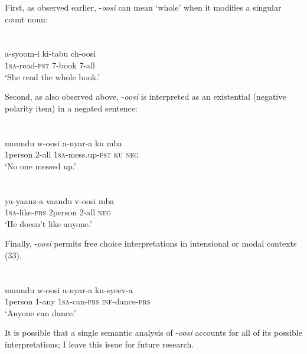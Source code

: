 \documentclass[output=paper]{langsci/langscibook}
\begin{document}
  First, as observed earlier, -\textit{oosi} can mean ‘whole’ when it modifies a singular count noun:

\chapter[  ]{  }
\gll a-syoom-i  ki-tabu  ch-oosi\\
     1\textsc{sa}{}-read-\textsc{pst}    7-book\textsc{  7-}all \\
\glt ‘She read the whole book.’
\z

  Second, as also observed above, -\textit{oosi} is interpreted as an existential (negative polarity item) in a negated sentence:  

\chapter[]{}
\chapter{}
\gll muundu  w-oosi    a-nyar-a    ku  mba  \\
     1person  2-all    1\textsc{sa}{}-mess.up-\textsc{pst}  \textsc{ku  neg}\\
\glt ‘No one messed up.’       \textit{ }
\z

\chapter{}
\gll ya-yaanz-a  vaandu   v-oosi    mba \\
     1\textsc{sa}{}-like-\textsc{prs}  2person     2-all    \textsc{neg}\\
\glt ‘He doesn't like anyone.’
\z

  Finally, -\textit{oosi} permits free choice interpretations in intensional or modal contexts (33).

\chapter[  ]{  }
\gll muundu  w-oosi    a-nyar-a  ku-syeev-a\\
     1person  1-any    1\textsc{sa}{}-can-\textsc{prs  inf-}dance-\textsc{prs} \\
\glt ‘Anyone can dance.’
\z

  It is possible that a single semantic analysis of -\textit{oosi }accounts for all of its possible interpretations; I leave this issue for future research. 
\end{document}
